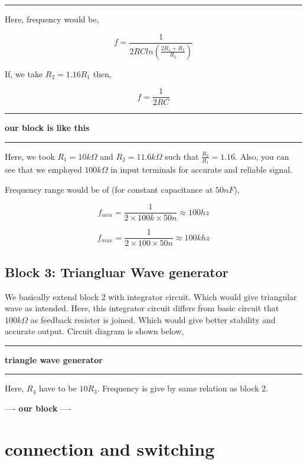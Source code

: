 \documentclass{article}
\begin{document}
\noindent\rule{\textwidth}{0.5pt}

Here, frequency would be, 

\begin{equation}
\label{eq:org6f5ac13}
  f =\frac{1}{2 RC ln(\frac{2R_{1}+R_{2}}{R_{2}})}
\end{equation}

If, we take \(R_{2}=1.16R_{1}\) then, 

\begin{equation}
\label{eq:org9325e0a}
  f =\frac{1}{2RC}
\end{equation}

\noindent\rule{\textwidth}{0.5pt}
\textbf{\textbf{our block is like this}}

\noindent\rule{\textwidth}{0.5pt}

Here, we took \(R_{1} = 10k\Omega\) and \(R_{2} = 11.6k\Omega\) such that \(\frac{R_{2}}{R_{1}}=1.16\). Also, you can see that we employed \(100k\Omega\) in input terminals for accurate and reliable signal.

Frequency range would be of (for constant capacitance at \(50nF\)),

\begin{equation*}
\label{eq:org075bab2}
  f_{min} =\frac{1}{2\times 100k\times 50n} \approx 100 hz
\end{equation*}

\begin{equation*}
\label{eq:org683bb33}
  f_{max} =\frac{1}{2\times 100 \times 50n} \approx 100 khz
\end{equation*}


\subsection{Block 3: Triangluar Wave generator}
\label{sec:org350001b}

We basically extend block 2 with integrator circuit. Which would give triangular wave as intended. Here, this integrator circuit differs from basic circuit that \(100k\Omega\) as feedback resister is joined. Which would give better stability and accurate output. Circuit diagram is shown below,

\noindent\rule{\textwidth}{0.5pt}
\textbf{\textbf{triangle wave generator}}

\noindent\rule{\textwidth}{0.5pt}

Here, \(R_{4}\) have to be \(10R_{3}\). Frequency is give by same relation as block 2.

----
\textbf{\textbf{our block}}
----




\section{connection and switching}
\label{sec:org0751e9f}
\end{document}
